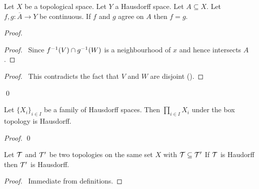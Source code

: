 \begin{proposition}
    Let $X$ be a topological space. Let $Y$ a Hausdorff space. Let $A \subseteq X$. Let $f, g : \overline{A} \rightarrow Y$ be continuous.
    If $f$ and $g$ agree on $A$ then $f = g$.
\end{proposition}

\begin{proof}
    \pf
    \begin{proof}
        \pf\ Since ${f}^{-1}(V) \cap {g}^{-1}(W)$ is a neighbourhood of $x$ and hence intersects $A$.
    \end{proof}
    \qedstep
    \begin{proof}
        \pf\ This contradicts the fact that $V$ and $W$ are disjoint ().
    \end{proof}
    \qed
\end{proof}

\begin{proposition}
    Let $\{ X_i \}_{i \in I}$ be a family of Hausdorff spaces. Then $\prod_{i \in I} X_i$ under the box topology is Hausdorff.
\end{proposition}

\begin{proof}
    \pf
    \qed
\end{proof}

\begin{proposition}
    \label{proposition:Hausdorff_finer}
    Let $\mathcal{T}$ and $\mathcal{T}'$ be two topologies on the same set $X$ with $\mathcal{T} \subseteq \mathcal{T}'$
    If $\mathcal{T}$ is Haudorff then $\mathcal{T}'$ is Hausdorff.
\end{proposition}

\begin{proof}
    \pf\ Immediate from definitions.
\end{proof}


